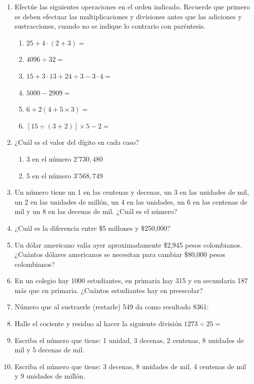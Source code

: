 \documentclass[letterpaper,fleqn]{article}
\newcommand{\LineaNombre}{%
\par
\vspace{\baselineskip}
Nombre:\hrulefill \; Curso: \underline{\hspace*{48pt}} \; Fecha: \underline{\hspace*{2.5cm}} \relax
\par}
\begin{document}
\begin{enumerate}
\item Efectúe las siguientes operaciones en el orden indicado. Recuerde que primero se deben efectuar las multiplicaciones y divisiones antes que las adiciones y sustracciones, cuando no se indique lo contrario con paréntesis.
\begin{enumerate}
\item $25+4\cdot (2+3)=$
\item $4096\div 32=$ 
\item $15+3\cdot 13+24\div 3-3\cdot 4=$ 
\item $5000-2909=$
\item $6+2(4+5\times 3)=$
\item $[15\div (3+2)]\times 5-2=$
\end{enumerate}
 \item ¿Cuál es el valor del dígito en cada caso?
 \begin{enumerate}
 \item 3 en el número $2'730,480$ 
 \item 5 en el número $3'568,749$  
 \end{enumerate}
 \item Un número tiene un 1 en las centenas y decenas, un 3 en las unidades de mil, un 2 en las unidades de millón, un 4 en las unidades, un 6 en las centenas de mil y un 8 en las decenas de mil. ¿Cuál es el número?
 \item ¿Cuál es la diferencia entre \$5 millones y \$250,000? 
 \item Un dólar americano valía ayer aproximadamente \$2,945 pesos colombianos. ¿Cuántos dólares americanos se necesitan para cambiar \$80,000 pesos colombianos?
  \item En un colegio hay 1000 estudiantes, en primaria hay 315 y en secundaria 187 más que en primaria. ¿Cuántos estudiantes hay en preescolar?
 \item Número que al sustraerle (restarle) 549 da como resultado 8361:
 \item Halle el cociente y residuo al hacer la siguiente división \;
 $1273\div 25=$
 \item Escriba el número que tiene: 1 unidad, 3 decenas, 2 centenas, 8 unidades de mil y 5 decenas de mil.
 \item Escriba el número que tiene: 3 decenas, 8 unidades de mil, 4 centenas de mil y 9 unidades de millón.
 \end{enumerate}
\end{document}
